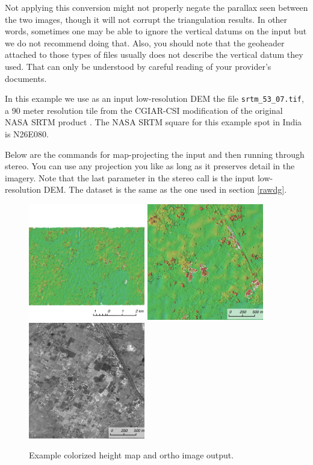 Not applying this conversion might not properly negate the parallax
seen between the two images, though it will not corrupt the
triangulation results. In other words, sometimes one may be able to
ignore the vertical datums on the input but we do not recommend
doing that. Also, you should note that the geoheader attached to those
types of files usually does not describe the vertical datum they
used. That can only be understood by careful reading of your
provider's documents.

In this example we use as an input low-resolution DEM the file
\texttt{srtm\_53\_07.tif}, a 90 meter resolution tile from the CGIAR-CSI
modification of the original NASA SRTM product \cite{cgiar:srtm90m}.
The NASA SRTM square for this example spot in India is N26E080.

Below are the commands for map-projecting the input and then running
through stereo. You can use any projection you like as long as it
preserves detail in the imagery. Note that the last parameter in the
stereo call is the input low-resolution DEM. The dataset is the same
as the one used in section \ref{rawdg}.

\begin{figure}[h!]
\centering
  \includegraphics[width=2.0in]{images/examples/dg/MappedContext.png}
  \includegraphics[width=2.0in]{images/examples/dg/MappedCloseUp.png}
  \includegraphics[width=2.0in]{images/examples/dg/MappedCloseUpDRG.png}
\caption{Example colorized height map and ortho image output.}
\label{fig:dg-map-example}
\end{figure}

